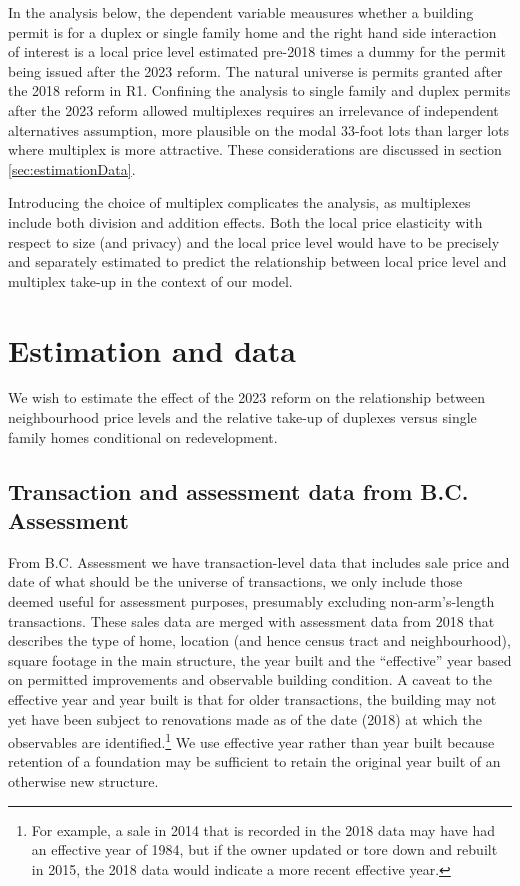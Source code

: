 \documentclass[12pt]{article}
\begin{document}
In the analysis below, the dependent variable meausures whether a building permit is for a duplex or single family home and the right hand side interaction of interest is a local price level estimated pre-2018 times a dummy for the permit being issued after the 2023 reform. The natural universe is permits granted after the 2018 reform in R1. Confining the analysis to single family and duplex permits after the 2023 reform allowed multiplexes requires an irrelevance of independent alternatives assumption, more plausible on the modal 33-foot lots than larger lots where multiplex is more attractive. These considerations are discussed in section \ref{sec:estimationData}.

Introducing the choice of multiplex complicates the analysis, as multiplexes include both division and addition effects. Both the local price elasticity with respect to size (and privacy) and the local price level would have to be precisely and separately estimated to predict the relationship between local price level and multiplex take-up in the context of our model.

\section{\label{sec:estimationData}Estimation and data}

We wish to estimate the effect of the 2023 reform on the relationship between neighbourhood price levels and the relative take-up of duplexes versus single family homes conditional on redevelopment.

\subsection{Transaction and assessment data from B.C. Assessment}

From B.C. Assessment we have transaction-level data that includes sale price and date of what should be the universe of transactions, we only include those deemed useful for assessment purposes, presumably excluding non-arm's-length transactions. These sales data are merged with assessment data from 2018 that describes the type of home, location (and hence census tract and neighbourhood), square footage in the main structure, the year built and the ``effective'' year based on permitted improvements and observable building condition. A caveat to the effective year and year built is that for older transactions, the building may not yet have been subject to renovations made as of the date (2018) at which the observables are identified.\footnote{For example, a sale in 2014 that is recorded in the 2018 data may have had an effective year of 1984, but if the owner updated or tore down and rebuilt in 2015, the 2018 data would indicate a more recent effective year.} We use effective year rather than year built because retention of a foundation may be sufficient to retain the original year built of an otherwise new structure.
\end{document}
